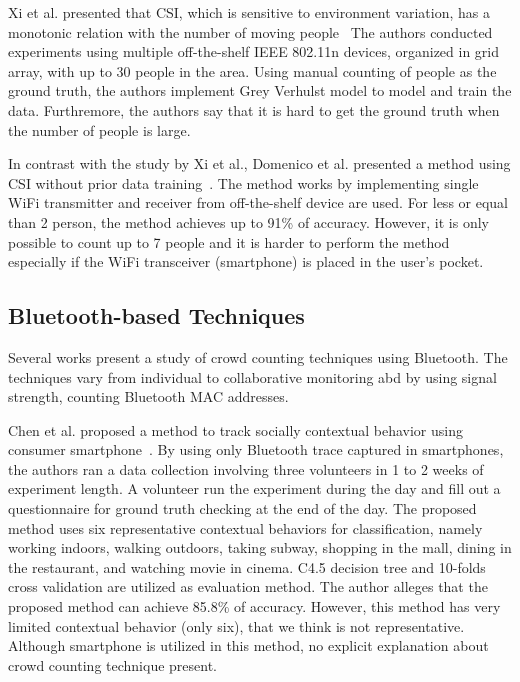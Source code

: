 	Xi et al. presented that \ac{CSI}, which is sensitive to environment variation, has a monotonic relation with the number of moving people~\cite{thesis006} The authors conducted experiments using multiple off-the-shelf IEEE 802.11n devices, organized in grid array, with up to 30 people in the area. Using manual counting of people as the ground truth, the authors implement Grey Verhulst model to model and train the data. Furthremore, the authors say that it is hard to get the ground truth when the number of people is large.

	In contrast with the study by Xi et al., Domenico et al. presented a method using \ac{CSI} without prior data training~\cite{thesis051}. The method works by implementing single WiFi transmitter and receiver from off-the-shelf device are used. For less or equal than 2 person, the method achieves up to 91\% of accuracy. However, it is only possible to count up to 7 people and it is harder to perform the method especially if the WiFi transceiver (smartphone) is placed in the user's pocket.

	

	

	



	


	

	

	

	










	\subsection{Bluetooth-based Techniques} %
	\label{sub:bluetooth-based-techniques}
	Several works present a study of crowd counting techniques using Bluetooth. The techniques vary from individual to collaborative monitoring abd by using signal strength, counting Bluetooth \ac{MAC} addresses. 

	Chen et al. proposed a method to track socially contextual behavior using consumer smartphone~\cite{thesis028}. By using only Bluetooth trace captured in smartphones, the authors ran a data collection involving three volunteers in 1 to 2 weeks of experiment length. A volunteer run the experiment during the day and fill out a questionnaire for ground truth checking at the end of the day. The proposed method uses six representative contextual behaviors for classification, namely working indoors, walking outdoors, taking subway, shopping in the mall, dining in the restaurant, and watching movie in cinema.
	C4.5 decision tree and 10-folds cross validation are utilized as evaluation method. The author alleges that the proposed method can achieve 85.8\% of accuracy. However, this method has very limited contextual behavior (only six), that we think is not representative. Although smartphone is utilized in this method, no explicit explanation about crowd counting technique present.

